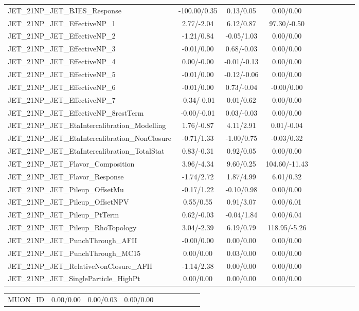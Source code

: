 \begin{table}[h]
\begin{center}
\begin{tabular}{l|ccccccccc}
JET\_21NP\_JET\_BJES\_Response &-100.00/0.35 &0.13/0.05 &0.00/0.00 \\
JET\_21NP\_JET\_EffectiveNP\_1 &2.77/-2.04 &6.12/0.87 &97.30/-0.50 \\
JET\_21NP\_JET\_EffectiveNP\_2 &-1.21/0.84 &-0.05/1.03 &0.00/0.00 \\
JET\_21NP\_JET\_EffectiveNP\_3 &-0.01/0.00 &0.68/-0.03 &0.00/0.00 \\
JET\_21NP\_JET\_EffectiveNP\_4 &0.00/-0.00 &-0.01/-0.13 &0.00/0.00 \\
JET\_21NP\_JET\_EffectiveNP\_5 &-0.01/0.00 &-0.12/-0.06 &0.00/0.00 \\
JET\_21NP\_JET\_EffectiveNP\_6 &-0.01/0.00 &0.73/-0.04 &-0.00/0.00 \\
JET\_21NP\_JET\_EffectiveNP\_7 &-0.34/-0.01 &0.01/0.62 &0.00/0.00 \\
JET\_21NP\_JET\_EffectiveNP\_8restTerm &-0.00/-0.01 &0.03/-0.03 &0.00/0.00 \\
JET\_21NP\_JET\_EtaIntercalibration\_Modelling &1.76/-0.87 &4.11/2.91 &0.01/-0.04 \\
JET\_21NP\_JET\_EtaIntercalibration\_NonClosure &-0.71/1.33 &-1.00/0.75 &-0.03/0.32 \\
JET\_21NP\_JET\_EtaIntercalibration\_TotalStat &0.83/-0.31 &0.92/0.05 &0.00/0.00 \\
JET\_21NP\_JET\_Flavor\_Composition &3.96/-4.34 &9.60/0.25 &104.60/-11.43 \\
JET\_21NP\_JET\_Flavor\_Response &-1.74/2.72 &1.87/4.99 &6.01/0.32 \\
JET\_21NP\_JET\_Pileup\_OffsetMu &-0.17/1.22 &-0.10/0.98 &0.00/0.00 \\
JET\_21NP\_JET\_Pileup\_OffsetNPV &0.55/0.55 &0.91/3.07 &0.00/6.01 \\
JET\_21NP\_JET\_Pileup\_PtTerm &0.62/-0.03 &-0.04/1.84 &0.00/6.04 \\
JET\_21NP\_JET\_Pileup\_RhoTopology &3.04/-2.39 &6.19/0.79 &118.95/-5.26 \\
JET\_21NP\_JET\_PunchThrough\_AFII &-0.00/0.00 &0.00/0.00 &0.00/0.00 \\
JET\_21NP\_JET\_PunchThrough\_MC15 &0.00/0.00 &0.03/0.00 &0.00/0.00 \\
JET\_21NP\_JET\_RelativeNonClosure\_AFII &-1.14/2.38 &0.00/0.00 &0.00/0.00 \\
JET\_21NP\_JET\_SingleParticle\_HighPt &0.00/0.00 &0.00/0.00 &0.00/0.00 \\
\hline \end{tabular} \end{center} \end{table} \begin{table}[h] \scriptsize \begin{center} \begin{tabular}{l|ccccccccc} \hline MUON\_ID &0.00/0.00 &0.00/0.03 &0.00/0.00 \\

\end{tabular}
\end{center}
\end{table}
